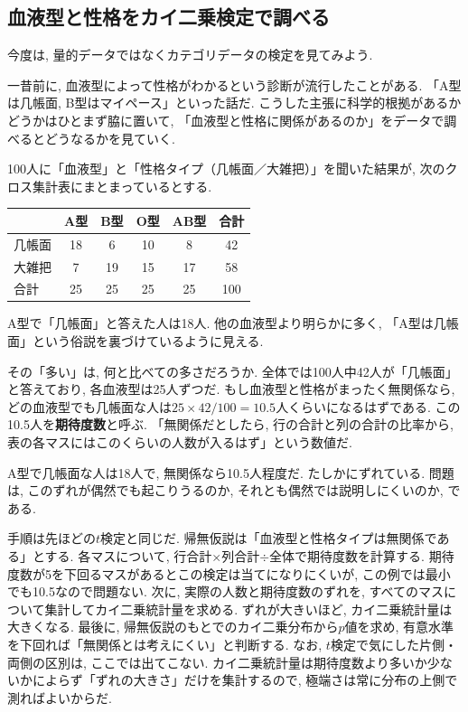   \subsection{血液型と性格をカイ二乗検定で調べる}

    今度は, 量的データではなくカテゴリデータの検定を見てみよう.

    一昔前に, 血液型によって性格がわかるという診断が流行したことがある.
    「A型は几帳面, B型はマイペース」といった話だ.
    こうした主張に科学的根拠があるかどうかはひとまず脇に置いて,
    「血液型と性格に関係があるのか」をデータで調べるとどうなるかを見ていく.

    100人に「血液型」と「性格タイプ（几帳面／大雑把）」を聞いた結果が, 次のクロス集計表にまとまっているとする.

    \begin{center}
      \begin{tabular}{l|cccc|c}
             & A型 & B型 & O型 & AB型 & 合計 \\
      \hline
      几帳面 & 18  & 6   & 10  & 8    & 42 \\
      大雑把 & 7   & 19  & 15  & 17   & 58 \\
      \hline
      合計   & 25  & 25  & 25  & 25   & 100
      \end{tabular}
    \end{center}

    A型で「几帳面」と答えた人は18人.
    他の血液型より明らかに多く, 「A型は几帳面」という俗説を裏づけているように見える.

    その「多い」は, 何と比べての多さだろうか.
    全体では100人中42人が「几帳面」と答えており, 各血液型は25人ずつだ.
    もし血液型と性格がまったく無関係なら, どの血液型でも几帳面な人は$25 \times 42/100 = 10.5$人くらいになるはずである.
    この10.5人を\textbf{期待度数}と呼ぶ.
    「無関係だとしたら, 行の合計と列の合計の比率から, 表の各マスにはこのくらいの人数が入るはず」という数値だ.

    A型で几帳面な人は18人で, 無関係なら10.5人程度だ.
    たしかにずれている.
    問題は, このずれが偶然でも起こりうるのか, それとも偶然では説明しにくいのか, である.

    手順は先ほどの$t$検定と同じだ.
    帰無仮説は「血液型と性格タイプは無関係である」とする.
    各マスについて, 行合計$\times$列合計$\div$全体で期待度数を計算する.
    期待度数が5を下回るマスがあるとこの検定は当てになりにくいが, この例では最小でも10.5なので問題ない.
    次に, 実際の人数と期待度数のずれを, すべてのマスについて集計してカイ二乗統計量を求める.
    ずれが大きいほど, カイ二乗統計量は大きくなる.
    最後に, 帰無仮説のもとでのカイ二乗分布から$p$値を求め, 有意水準を下回れば「無関係とは考えにくい」と判断する.
    なお, $t$検定で気にした片側・両側の区別は, ここでは出てこない.
    カイ二乗統計量は期待度数より多いか少ないかによらず「ずれの大きさ」だけを集計するので, 極端さは常に分布の上側で測ればよいからだ.

